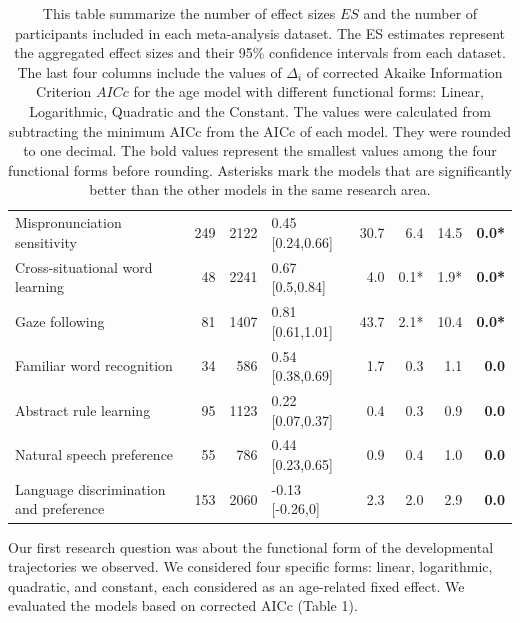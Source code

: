 \documentclass[10pt, letterpaper]{article}
\begin{document}
\begin{table}[ht]
\begin{tabular}{l|r|r|l|r|r|r|r}
Mispronunciation sensitivity & 249 & 2122 & 0.45 [0.24,0.66] & 30.7 & 6.4 & 14.5 & \textbf{0.0*}\\
Cross-situational word learning & 48 & 2241 & 0.67 [0.5,0.84] & 4.0 & 0.1* & 1.9* & \textbf{0.0*}\\
Gaze following  & 81 & 1407 & 0.81 [0.61,1.01] & 43.7 & 2.1* & 10.4 & \textbf{0.0*}\\
Familiar word recognition & 34 & 586 & 0.54 [0.38,0.69] & 1.7 & 0.3 & 1.1 & \textbf{0.0}\\
Abstract rule learning & 95 & 1123 & 0.22 [0.07,0.37] & 0.4 & 0.3 & 0.9 & \textbf{0.0}\\
Natural speech preference & 55 & 786 & 0.44 [0.23,0.65] & 0.9 & 0.4 & 1.0 & \textbf{0.0}\\
Language discrimination and preference & 153 & 2060 & -0.13 [-0.26,0] & 2.3 & 2.0 & 2.9 & \textbf{0.0}\\


\hline
\end{tabular}
\caption{\label{demo-table}This table summarize the number of effect sizes \(ES\) and the number of participants included in each meta-analysis dataset. The ES estimates represent the aggregated effect sizes and their 95\% confidence intervals from each dataset. The last four columns include the values of $\Delta_{i}$ of corrected Akaike Information Criterion \(AICc\) for the age model with different functional forms: Linear, Logarithmic, Quadratic and the Constant. The values were calculated from subtracting the minimum AICc from the AICc of each model. They were rounded to one decimal. The bold values represent the smallest values among the four functional forms before rounding. Asterisks mark the models that are significantly better than the other models in the same research area.}
\end{table}

Our first research question was about the functional form of the
developmental trajectories we observed. We considered four specific
forms: linear, logarithmic, quadratic, and constant, each considered as
an age-related fixed effect. We evaluated the models based on corrected
AICc (Table 1).
\end{document}

